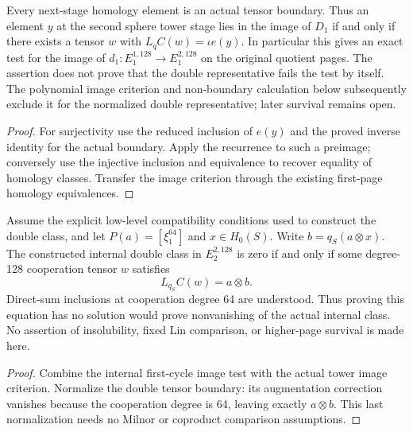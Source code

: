 \begin{proposition}
  \label{prop:h6-first-incoming-cobar-image}
  \leanok
  Every next-stage homology element is an actual tensor boundary. Thus an
  element $y$ at the second sphere tower stage lies in the image of $D_1$
  if and only if there exists a tensor $w$ with $L_qC(w)=\iota e(y)$.
  In particular this gives an exact test for the image of
  $d_1:E_1^{1,128}\to E_1^{2,128}$ on the original quotient pages.
  The assertion does not prove that the double representative fails the
  test by itself. The polynomial image criterion and non-boundary
  calculation below subsequently exclude it for the normalized double
  representative; later survival remains open.
\end{proposition}
\begin{proof}
  For surjectivity use the reduced inclusion of $e(y)$ and the proved
  inverse identity for the actual boundary. Apply the recurrence to
  such a preimage; conversely use the injective inclusion and equivalence
  to recover equality of homology classes. Transfer the image criterion
  through the existing first-page homology equivalences.
  \leanok
\end{proof}

\begin{proposition}
  \label{prop:h6-internal-square-cobar-image}
  \leanok
  Assume the explicit low-level compatibility conditions used to construct
  the double class, and let $P(a)=[\xi_1^{64}]$ and $x\in H_0(S)$.
  Write $b=q_S(a\otimes x)$. The constructed internal double class in
  $E_2^{2,128}$ is zero if and only if some degree-128 cooperation tensor
  $w$ satisfies
  \[
    L_{q_S}C(w)=a\otimes b.
  \]
  Direct-sum inclusions at cooperation degree 64 are understood.
  Thus proving this equation has no solution would prove nonvanishing
  of the actual internal class. No assertion of insolubility, fixed Lin
  comparison, or higher-page survival is made here.
\end{proposition}
\begin{proof}
  Combine the internal first-cycle image test with the actual tower
  image criterion. Normalize the double tensor boundary: its
  augmentation correction vanishes because the cooperation degree is
  64, leaving exactly $a\otimes b$. This last normalization needs no
  Milnor or coproduct comparison assumptions.
  \leanok
\end{proof}

